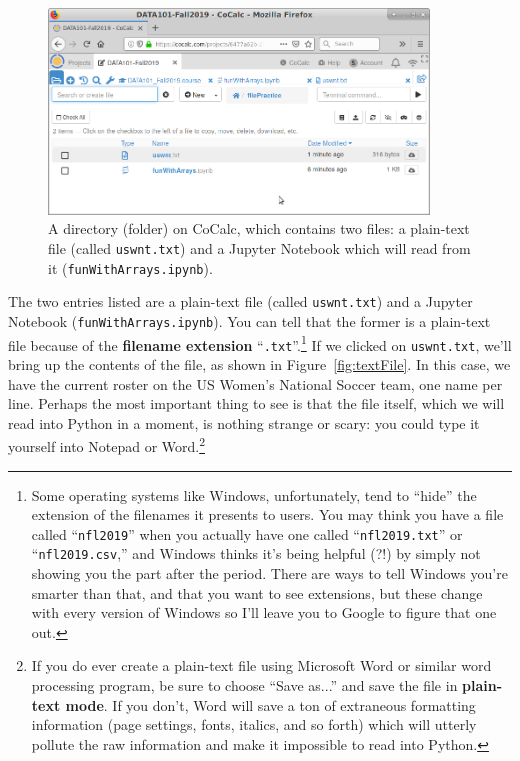 \begin{figure}[ht]
\centering
\includegraphics[width=0.9\textwidth]{folder.png}
\medskip
\caption{A directory (folder) on CoCalc, which contains two files: a plain-text
file (called \texttt{uswnt.txt}) and a Jupyter Notebook which will read from it
(\texttt{funWithArrays.ipynb}).}
\label{fig:folder}
\end{figure}

\label{extensions}

The two entries listed are a plain-text file (called \texttt{uswnt.txt}) and a
Jupyter Notebook (\texttt{funWithArrays.ipynb}). You can tell that the former
is a plain-text file because of the \textbf{filename extension}
``\texttt{.txt}''.\footnote{Some operating systems like Windows, unfortunately,
tend to ``hide'' the extension of the filenames it presents to users. You may
think you have a file called ``\texttt{nfl2019}'' when you actually have one
called ``\texttt{nfl2019.txt}'' or ``\texttt{nfl2019.csv},'' and Windows thinks
it's being helpful (?!) by simply not showing you the part after the period.
There are ways to tell Windows you're smarter than that, and that you want to
see extensions, but these change with every version of Windows so I'll leave
you to Google to figure that one out.} If we clicked on \texttt{uswnt.txt},
we'll bring up the contents of the file, as shown in Figure~\ref{fig:textFile}.
In this case, we have the current roster on the US Women's National Soccer
team, one name per line. Perhaps the most important thing to see is that the
file itself, which we will read into Python in a moment, is nothing strange or
scary: you could type it yourself into Notepad or Word.\footnote{If you do ever
create a plain-text file using Microsoft Word or similar word processing
program, be sure to choose ``Save as...'' and save the file in
\textbf{plain-text mode}. If you don't, Word will save a ton of extraneous
formatting information (page settings, fonts, italics, and so forth) which will
utterly pollute the raw information and make it impossible to read into
Python.}

